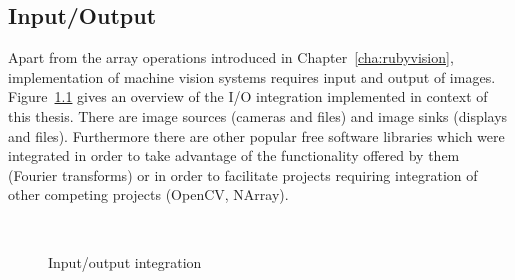 \documentclass[12pt,a4paper,oneside,openright]{book}
\newcommand{\cha}[1]{Chapter~\ref{cha:#1}}
\newcommand{\fig}[1]{Figure~\ref{fig:#1}}
\begin{document}
\begin{CJK}{UTF8}{}
\chapter{Input/Output}\label{cha:io}
Apart from the array operations introduced in \cha{rubyvision}, implementation of machine vision systems requires input and output of images. \fig{interfaces} gives an overview of the \ac{I}/\ac{O} integration implemented in context of this thesis. There are image sources (cameras and files) and image sinks (displays and files). Furthermore there are other popular free software libraries which were integrated in order to take advantage of the functionality offered by them (Fourier transforms) or in order to facilitate projects requiring integration of other competing projects (OpenCV, NArray).
\begin{figure}[htbp]
   \begin{center}
     \\
     \caption{Input/output integration\label{fig:interfaces}}
   \end{center}
\end{figure}


\end{CJK}
\end{document}
